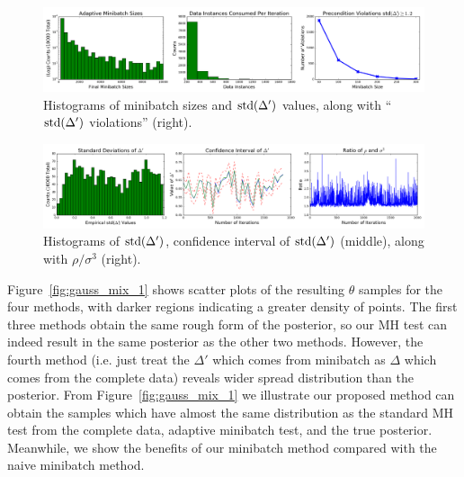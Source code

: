 \documentclass{article}
\begin{document}
\begin{figure}[t]
    \centering
    \includegraphics[width=1\linewidth]{adaptive_and_ours_information_v01.png}
    \caption{
    Histograms of minibatch sizes and ${\rm std}(\Delta')$ values, along with ``${\rm std}(\Delta')$
    violations'' (right).
    }
    \label{fig:gauss_mix_2}
\end{figure}

\begin{figure}[t]
    \centering
    \includegraphics[width=1\linewidth]{CI_v01.png}
    \caption{
    Histograms of ${\rm std}(\Delta')$, confidence interval of ${\rm std}(\Delta')$ (middle), along with $\rho / \sigma^3$ (right).
    }
    \label{fig:gauss_mix_3}
\end{figure}

Figure~\ref{fig:gauss_mix_1} shows scatter plots of the resulting $\theta$ samples for the four
methods, with darker regions indicating a greater density of points. The first three methods obtain the
same rough form of the posterior, so our MH test can indeed result in the same posterior as the
other two methods. However, the fourth method (i.e. just treat the $\Delta'$ which comes from minibatch as $\Delta$ which comes from the complete data) reveals wider spread distribution than the posterior. From Figure~\ref{fig:gauss_mix_1} we illustrate our proposed method can obtain the samples which have almost the same distribution as the standard MH test from the complete data, adaptive minibatch test, and the true posterior. Meanwhile, we show the benefits of our minibatch method compared with the naive minibatch method.  
\end{document}
